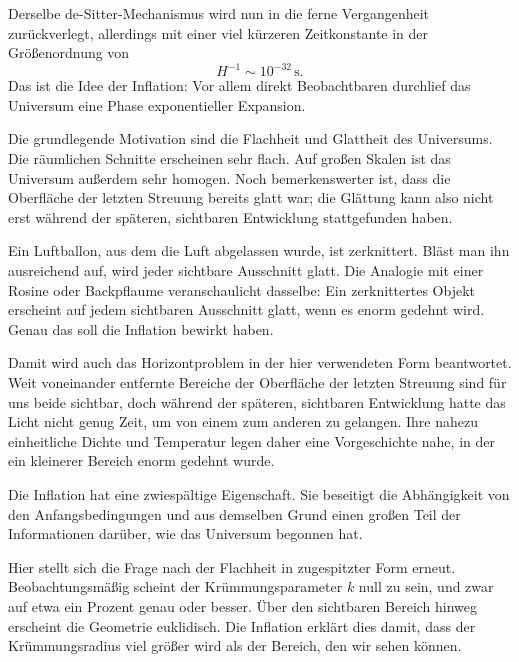 Derselbe de-Sitter-Mechanismus wird nun in die ferne Vergangenheit zurückverlegt, allerdings mit einer viel kürzeren Zeitkonstante in der Größenordnung von
\begin{equation}
H^{-1}\sim 10^{-32}\,\mathrm{s}.
\end{equation}
Das ist die Idee der Inflation: Vor allem direkt Beobachtbaren durchlief das Universum eine Phase exponentieller Expansion.

Die grundlegende Motivation sind die Flachheit und Glattheit des Universums. Die räumlichen Schnitte erscheinen sehr flach. Auf großen Skalen ist das Universum außerdem sehr homogen. Noch bemerkenswerter ist, dass die Oberfläche der letzten Streuung bereits glatt war; die Glättung kann also nicht erst während der späteren, sichtbaren Entwicklung stattgefunden haben.

Ein Luftballon, aus dem die Luft abgelassen wurde, ist zerknittert. Bläst man ihn ausreichend auf, wird jeder sichtbare Ausschnitt glatt. Die Analogie mit einer Rosine oder Backpflaume veranschaulicht dasselbe: Ein zerknittertes Objekt erscheint auf jedem sichtbaren Ausschnitt glatt, wenn es enorm gedehnt wird. Genau das soll die Inflation bewirkt haben.

Damit wird auch das Horizontproblem in der hier verwendeten Form beantwortet. Weit voneinander entfernte Bereiche der Oberfläche der letzten Streuung sind für uns beide sichtbar, doch während der späteren, sichtbaren Entwicklung hatte das Licht nicht genug Zeit, um von einem zum anderen zu gelangen. Ihre nahezu einheitliche Dichte und Temperatur legen daher eine Vorgeschichte nahe, in der ein kleinerer Bereich enorm gedehnt wurde.

Die Inflation hat eine zwiespältige Eigenschaft. Sie beseitigt die Abhängigkeit von den Anfangsbedingungen und aus demselben Grund einen großen Teil der Informationen darüber, wie das Universum begonnen hat.

Hier stellt sich die Frage nach der Flachheit in zugespitzter Form erneut. Beobachtungsmäßig scheint der Krümmungsparameter \(k\) null zu sein, und zwar auf etwa ein Prozent genau oder besser. Über den sichtbaren Bereich hinweg erscheint die Geometrie euklidisch. Die Inflation erklärt dies damit, dass der Krümmungsradius viel größer wird als der Bereich, den wir sehen können.

\begin{classroomqa}
\end{classroomqa}

